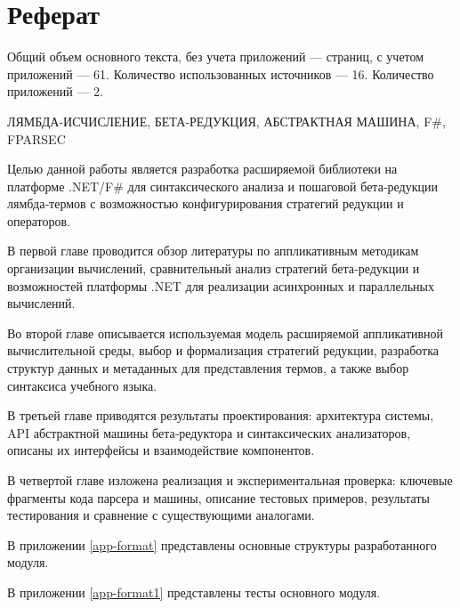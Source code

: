\chapter*{Реферат}
\thispagestyle{plain}

Общий объем основного текста, без учета приложений — \pageref{end_of_main_text} страниц, с учетом приложений — 61. Количество использованных источников — 16. Количество приложений — 2.

\noindent \uppercase{лямбда-исчисление, бета‑редукция, абстрактная машина, F\#, FParsec}

Целью данной работы является разработка расширяемой библиотеки на платформе .NET/F\# для синтаксического анализа и пошаговой бета‑редукции лямбда‑термов с возможностью конфигурирования стратегий редукции и операторов.

В первой главе проводится обзор литературы по аппликативным методикам организации вычислений, сравнительный анализ стратегий бета‑редукции и возможностей платформы .NET для реализации асинхронных и параллельных вычислений.

Во второй главе описывается используемая модель расширяемой аппликативной вычислительной среды, выбор и формализация стратегий редукции, разработка структур данных и метаданных для представления термов, а также выбор синтаксиса учебного языка.

В третьей главе приводятся результаты проектирования: архитектура системы, API абстрактной машины бета‑редуктора и синтаксических анализаторов, описаны их интерфейсы и взаимодействие компонентов.

В четвертой главе изложена реализация и экспериментальная проверка: ключевые фрагменты кода парсера и машины, описание тестовых примеров, результаты тестирования и сравнение с существующими аналогами.

В приложении \ref{app-format} представлены основные структуры разработанного модуля.

В приложении \ref{app-format1} представлены тесты основного модуля.

